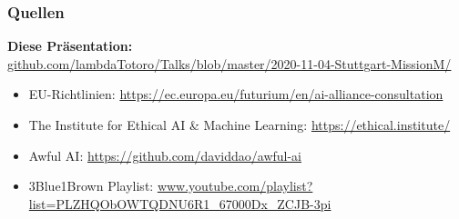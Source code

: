 \documentclass[aspectratio=169,xcolor=dvipsnames]{beamer}
\begin{document}
\begin{frame}
\frametitle{Quellen}
\small
\begin{center}
\textbf{Diese Präsentation:}\\
\url{github.com/lambdaTotoro/Talks/blob/master/2020-11-04-Stuttgart-MissionM/}
\end{center}
\bigskip

\begin{itemize}
\item EU-Richtlinien: \url{https://ec.europa.eu/futurium/en/ai-alliance-consultation}
\item The Institute for Ethical AI \& Machine Learning: \url{https://ethical.institute/}
\item Awful AI: \url{https://github.com/daviddao/awful-ai}
\item 3Blue1Brown Playlist: \url{www.youtube.com/playlist?list=PLZHQObOWTQDNU6R1_67000Dx_ZCJB-3pi}
\end{itemize}
\end{frame}
\end{document}
